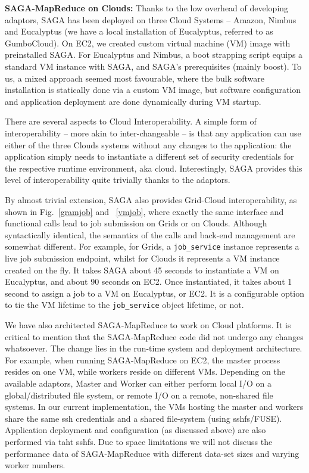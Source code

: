 \documentclass[conference,final]{IEEEtran}
\newcommand{\sagamapreduce }{SAGA-MapReduce }
\begin{document}

{\bf SAGA-MapReduce on Clouds: } Thanks to the low overhead of
developing adaptors, SAGA has been deployed on three Cloud Systems --
Amazon, Nimbus and Eucalyptus (we have a local installation of
Eucalyptus, referred to as GumboCloud).  On EC2, we created custom
virtual machine (VM) image with preinstalled SAGA.  For Eucalyptus and
Nimbus, a boot strapping script equips a standard VM instance with
SAGA, and SAGA's prerequisites (mainly boost).  To us, a mixed
approach seemed most favourable, where the bulk software installation
is statically done via a custom VM image, but software configuration
and application deployment are done dynamically during VM startup.

There are several aspects to Cloud Interoperability. A simple form of
interoperability -- more akin to inter-changeable -- is that any
application can use either of the three Clouds systems without any
changes to the application: the application simply needs to
instantiate a different set of security credentials for the respective
runtime environment, aka cloud.  Interestingly, SAGA provides this level of
interoperability quite trivially thanks to the adaptors.

By almost
trivial extension, SAGA also provides Grid-Cloud interoperability, as shown
in Fig.~\ref{gramjob} and ~\ref{vmjob}, where exactly the same
interface and functional calls lead to job submission on Grids or on
Clouds. Although syntactically identical, the semantics of the calls
and back-end management are somewhat different.  For example, for
Grids, a \texttt{job\_service} instance represents a live job
submission endpoint, whilst for Clouds it represents a VM
instance created on the fly.  It takes SAGA about 45 seconds to
instantiate a VM on Eucalyptus, and about 90 seconds on EC2. Once
instantiated, it takes about 1 second to assign a job to a VM on
Eucalyptus, or EC2.  It is a configurable option to tie the VM
lifetime to the \texttt{job\_service} object lifetime, or not.

We have also architected \sagamapreduce to work on Cloud platforms.  It
is critical to mention that the \sagamapreduce code did not undergo
any changes whatsoever. The change lies in the run-time system and
deployment architecture. For example, when running \sagamapreduce on
EC2, the master process resides on one VM, while workers reside on
different VMs.
Depending on the available adaptors, Master and Worker can either 
perform local I/O on a global/distributed file system, or remote 
I/O on a remote, non-shared file systems.  In our current implementation, 
the VMs hosting the master and workers share the same ssh
credentials and a shared file-system (using sshfs/FUSE).  Application
deployment and configuration (as discussed above) are also performed
via taht sshfs.
Due to space limitations we will not
discuss the performance data of \sagamapreduce with different data-set
sizes and varying worker numbers.
\end{document}
